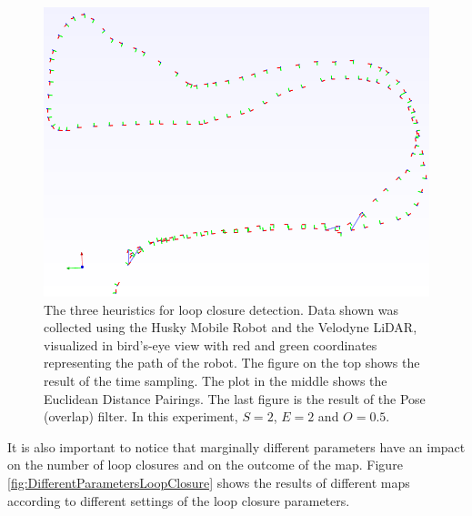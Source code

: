\documentclass[11pt]{article}
\begin{document}
\begin{figure}
\begin{minipage}{0.67\textwidth}
\includegraphics[width=\textwidth]{LoopClosureFinal}
\end{minipage}\hfill
\begin{minipage}{0.33\textwidth}
\centering
\caption[t]{The three heuristics for loop closure detection. Data shown was collected using the Husky Mobile Robot and the Velodyne LiDAR, visualized in bird's-eye view with red and green coordinates representing the path of the robot. The figure on the top shows the result of the time sampling. The plot in the middle shows the Euclidean Distance Pairings. The last figure is the result of the Pose (overlap) filter. In this experiment, $S=2$, $E=2$ and $O=0.5$.}
\label{fig:loopClosureDetection}
\end{minipage}
\end{figure}

It is also important to notice that marginally different parameters have an impact on the number of loop closures and on the outcome of the map. Figure \ref{fig:DifferentParametersLoopClosure} shows the results of different maps according to different settings of the loop closure parameters.
\end{document}
